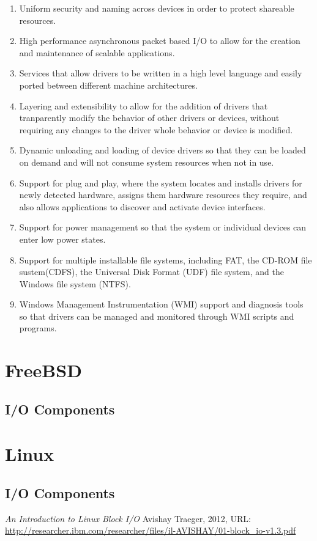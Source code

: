 \documentclass[letterpaper,draftclsnofoot,10pt,onecolumn,titlepage]{IEEEtran}\usepackage[margin=0.75in]{geometry}
\begin{document}
\begin{enumerate}
\item Uniform security and naming across devices in order to protect shareable resources.
\item High performance asynchronous packet based I/O to allow for the creation and maintenance of scalable 
      applications.
\item Services that allow drivers to be written in a high level language and easily ported between different 
      machine architectures.
\item Layering and extensibility to allow for the addition of drivers that tranparently modify the behavior 
      of other drivers or devices, without requiring any changes to the driver whole behavior or device is 
      modified.
\item Dynamic unloading and loading of device drivers so that they can be loaded on demand and will not 
      consume system resources when not in use.
\item Support for plug and play, where the system locates and installs drivers for newly detected hardware, 
      assigns them hardware resources they require, and also allows applications to discover and activate 
      device interfaces.
\item Support for power management so that the system or individual devices can enter low power states.
\item Support for multiple installable file systems, including FAT, the CD-ROM file sustem(CDFS), the 
      Universal Disk Format (UDF) file system, and the Windows file system (NTFS).
\item Windows Management Instrumentation (WMI) support and diagnosis tools so that drivers can be managed 
      and monitored through WMI scripts and programs.
\end{enumerate}


\section{FreeBSD}

\subsection{I/O Components}


\section{Linux}

\subsection{I/O Components}


\begin{thebibliography}{1}

    \textit{An Introduction to Linux Block I/O}
    Avishay Traeger, 2012, URL: \url{http://researcher.ibm.com/researcher/files/il-AVISHAY/01-block_io-v1.3.pdf}

\end{thebibliography}
\end{document}
